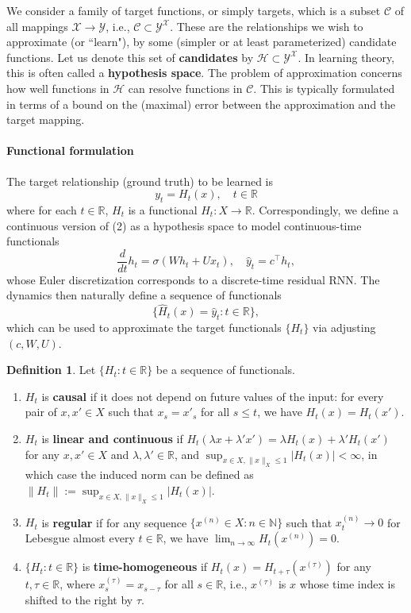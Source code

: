 \documentclass{article}
\theoremstyle{definition}
\newtheorem{definition}{Definition}
\theoremstyle{remark}
\begin{document}
We consider a family of target functions, or simply targets, which is a subset \(\mathcal{C} \) of all mappings \( \mathcal{X} \rightarrow \mathcal{Y} \), i.e., \( \mathcal{C} \subset \mathcal{Y}^\mathcal{X} \). 
These are the relationships we wish to approximate (or ``learn"), by some (simpler or at least parameterized) candidate functions.
Let us denote this set of \textbf{candidates} by \( \mathcal{H} \subset \mathcal{Y}^\mathcal{X} \).
In learning theory, this is often called a \textbf{hypothesis space}.
The problem of approximation concerns how well functions in \( \mathcal{H} \) can resolve functions in \( \mathcal{C} \).
This is typically formulated in terms of a bound on the (maximal) error between the approximation and the target mapping.



\paragraph{Functional formulation} 
The target relationship (ground truth) to be learned is 
\[
y_t = H_t(x), \quad t \in \mathbb{R}
\]
where for each $t \in \mathbb{R}$, $H_t$ is a functional $H_t : X \to \mathbb{R}$. Correspondingly, we define a continuous version of (2) as a hypothesis space to model continuous-time functionals
\[
\frac{d}{dt} h_t = \sigma(W h_t + U x_t), \quad \hat{y}_t = c^\top h_t,
\]
whose Euler discretization corresponds to a discrete-time residual RNN. The dynamics then naturally define a sequence of functionals 
\[
\{\hat{H}_t(x) = \hat{y}_t : t \in \mathbb{R}\},
\]
which can be used to approximate the target functionals $\{H_t\}$ via adjusting $(c, W, U)$.


\begin{definition}
Let $\{H_t : t \in \mathbb{R}\}$ be a sequence of functionals.
\begin{enumerate}
    \item $H_t$ is \textbf{causal} if it does not depend on future values of the input: for every pair of $x, x' \in X$ such that $x_s = x'_s$ for all $s \leq t$, we have $H_t(x) = H_t(x')$.
    
    \item $H_t$ is \textbf{linear and continuous} if $H_t(\lambda x + \lambda' x') = \lambda H_t(x) + \lambda' H_t(x')$ for any $x, x' \in X$ and $\lambda, \lambda' \in \mathbb{R}$, and $\sup_{x \in X, \|x\|_X \leq 1} |H_t(x)| < \infty$, in which case the induced norm can be defined as $\|H_t\| := \sup_{x \in X, \|x\|_X \leq 1} |H_t(x)|$.
    
    \item $H_t$ is \textbf{regular} if for any sequence $\{x^{(n)} \in X : n \in \mathbb{N}\}$ such that $x^{(n)}_t \to 0$ for Lebesgue almost every $t \in \mathbb{R}$, we have $\lim_{n \to \infty} H_t(x^{(n)}) = 0$.
    
    \item $\{H_t : t \in \mathbb{R}\}$ is \textbf{time-homogeneous} if $H_t(x) = H_{t+\tau}(x^{(\tau)})$ for any $t, \tau \in \mathbb{R}$, where $x^{(\tau)}_s = x_{s-\tau}$ for all $s \in \mathbb{R}$, i.e., $x^{(\tau)}$ is $x$ whose time index is shifted to the right by $\tau$.
\end{enumerate}
\end{definition}
\end{document}
